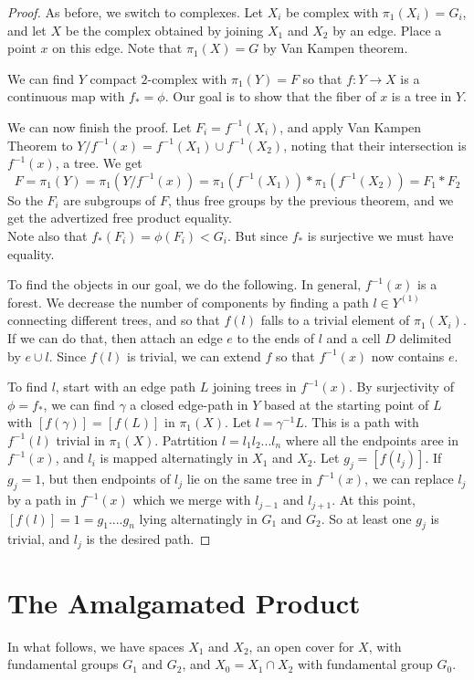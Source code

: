 \documentclass[11pt]{article}
\theoremstyle{definition}
\theoremstyle{example}
\theoremstyle{remark}
\theoremstyle{lemma}
\theoremstyle{proposition}
\theoremstyle{Problem}
\theoremstyle{Solution}
\theoremstyle{theorem}
\theoremstyle{corollary}
\begin{document}
\begin{proof}
As before, we switch to complexes. Let $X_i$ be complex with $\pi_1(X_i) = G_i$, and let $X$ be the complex obtained by joining $X_1$ and $X_2$ by an edge. Place a point $x$ on this edge. Note that $\pi_1(X) = G$ by Van Kampen theorem.


We can find $Y$ compact $2$-complex with $\pi_1(Y) = F$ so that $f:Y\to X$ is a continuous map with $f_* = \phi$. Our goal is to show that the fiber of $x$ is a tree in $Y$.

We can now finish the proof. Let $F_i = f^{-1}(X_i)$, and apply Van Kampen Theorem to $Y/f^{-1}(x) = f^{-1}(X_1) \cup f^{-1}(X_2)$, noting that their intersection is $f^{-1}(x)$, a tree. We get 
$$F = \pi_1(Y) = \pi_1(Y/f^{-1}(x)) = \pi_1(f^{-1}(X_1))*\pi_1(f^{-1}(X_2)) = F_1*F_2$$
So the $F_i$ are subgroups of $F$, thus free groups by the previous theorem, and we get the advertized free product equality. \\
Note also that $f_*(F_i) = \phi(F_i) < G_i$. But since $f_*$ is surjective we must have equality. 


To find the objects in our goal, we do the following. In general, $f^{-1}(x)$ is a forest. We decrease the number of components by finding a path $l\in Y^{(1)}$ connecting different trees, and so that $f(l)$ falls to a trivial element of $\pi_1(X_i)$. If we can do that, then attach an edge $e$ to the ends of $l$ and a cell $D$ delimited by $e\cup l$. Since $f(l)$ is trivial, we can extend $f$ so that $f^{-1}(x)$ now contains $e$.

To find $l$, start with an edge path $L$ joining trees in $f^{-1}(x)$. By surjectivity of $\phi=f_*$, we can find $\gamma$ a closed edge-path in $Y$ based at the starting point of $L$ with $[f(\gamma)] = [f(L)]$ in $\pi_1(X)$. Let $l=\gamma^{-1}L$. This is a path with $f^{-1}(l)$ trivial in $\pi_1(X)$. Patrtition $l=l_1l_2...l_n$ where all the endpoints aree in $f^{-1}(x)$, and $l_i$ is mapped alternatingly in $X_1$ and $X_2$. Let $g_j=[f(l_j)]$. If $g_j=1$, but then endpoints of $l_j$ lie on the same tree in $f^{-1}(x)$, we can replace $l_j$ by a path in $f^{-1}(x)$ which we merge with $l_{j-1}$ and $l_{j+1}$. At this point, $[f(l)] = 1 = g_1....g_n$ lying alternatingly in $G_1$ and $G_2$. So at least one $g_j$ is trivial, and $l_j$ is the desired path.
\end{proof}


\section{The Amalgamated Product}
In what follows, we have spaces $X_1$ and $X_2$, an open cover for $X$, with fundamental groups $G_1$ and $G_2$, and $X_0 = X_1\cap X_2$ with fundamental group $G_0$.
\end{document}
